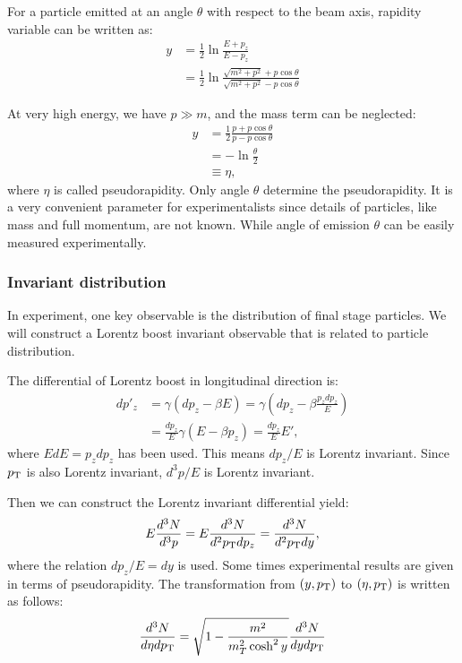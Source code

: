 For a particle emitted at an angle $\theta$ with respect to the beam axis, rapidity variable can be written as:
\begin{equation}
\begin{split}
y &= \frac{1}{2} \ln \frac{E + p_z}{E - p_z} \\
&= \frac{1}{2} \ln \frac{\sqrt{m^2 + p^2} + p\cos\theta}{\sqrt{m^2 + p^2} - p\cos\theta}
\end{split}
\end{equation}

At very high energy, we have $p \gg m$, and the mass term can be neglected:
\begin{equation}
\begin{split}
y &= \frac{1}{2} \frac{p + p\cos\theta}{p - p\cos\theta} \\
&= - \ln \frac{\theta}{2} \\
&\equiv \eta,
\end{split}
\end{equation}
where $\eta$ is called pseudorapidity. Only angle $\theta$ determine the pseudorapidity. It is a very convenient parameter for experimentalists since details of particles, like mass and full momentum, are not known. While angle of emission $\theta$ can be easily measured experimentally.



\subsubsection{Invariant distribution}

In experiment, one key observable is the distribution of final stage particles. We will construct a Lorentz boost invariant observable that is related to particle distribution.

The differential of Lorentz boost in longitudinal direction is:
\begin{equation}
\begin{split}
dp'_z &= \gamma (dp_z - \beta E) = \gamma (dp_z - \beta \frac{p_z dp_z}{E}) \\
&= \frac{dp_z}{E}\gamma(E - \beta p_z) = \frac{dp_z}{E} E',
\end{split}
\end{equation}
where $EdE = p_z dp_z$ has been used. This means $dp_z / E$ is Lorentz invariant. Since $p_\text{T}$ is also Lorentz invariant, $d^3p / E$ is Lorentz invariant.

Then we can construct the Lorentz invariant differential yield:
\begin{equation}
E\frac{d^3 N}{d^3 p} = E\frac{d^3 N}{d^2 p_\text{T} dp_z} = \frac{d^3 N}{d^2 p_\text{T} dy},
\end{equation}
where the relation $dp_z / E = dy$ is used. Some times experimental results are given in terms of pseudorapidity. The transformation from $(y, p_\text{T})$ to $(\eta, p_\text{T})$ is written as follows:
\begin{equation}
\frac{d^3 N}{d\eta dp_\text{T}} = \sqrt{1 - \frac{m^2}{m^2_T \cosh^2 y}}\frac{d^3 N}{dy dp_\text{T}}
\end{equation}



